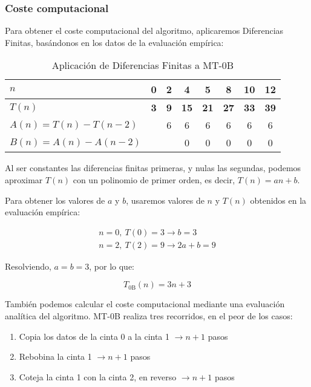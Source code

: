 \subsubsection*{Coste computacional}
Para obtener el coste computacional del algoritmo, aplicaremos Diferencias Finitas, basándonos en los datos de la evaluación empírica:

\begin{table}[H]
    \centering
    \begin{tabular}{|l|c|c|c|c|c|c|c|}
        \hline
        $n$ & \textbf{0} & \textbf{2} & \textbf{4} & \textbf{5} & \textbf{8} & \textbf{10} & \textbf{12} \\ \hline
        $T(n)$ & \textbf{3} & \textbf{9} & \textbf{15} & \textbf{21} & \textbf{27} & \textbf{33} & \textbf{39} \\ \hline
        \hline
        $A(n) = T(n) - T(n-2)$ &    &  6 &  6 &  6 &  6 &  6 &  6 \\ \hline
        $B(n) = A(n) - A(n-2)$ &    &    & 0 &  0 &  0 &  0 &  0 \\ \hline
    \end{tabular}
    \label{tab:0B}
    \caption{Aplicación de Diferencias Finitas a MT-0B}
\end{table}

Al ser constantes las diferencias finitas primeras, y nulas las segundas, podemos aproximar $T(n)$ con un polinomio de primer orden, es decir, $T(n) = an + b$.\medskip

Para obtener los valores de $a$ y $b$, usaremos valores de $n$ y $T(n)$ obtenidos en la evaluación empírica:

\begin{subequations}
    \begin{gather*}
        n = 0,\ T(0) = 3 \rightarrow b = 3 \\
        n = 2,\ T(2) = 9 \rightarrow 2a + b = 9
    \end{gather*}
\end{subequations}

Resolviendo, $a=b=3$, por lo que:

\begin{equation}
    T_{\mathrm{0B}}(n) = 3n + 3
    \label{eq:Tn0B}
\end{equation}

También podemos calcular el coste computacional mediante una evaluación analítica del algoritmo. MT-0B realiza tres recorridos, en el peor de los casos:
\begin{enumerate}
    \item Copia los datos de la cinta 0 a la cinta 1 $\rightarrow n+1$ pasos
    \item Rebobina la cinta 1 $\rightarrow n+1$ pasos
    \item Coteja la cinta 1 con la cinta 2, en reverso $\rightarrow n+1$ pasos
\end{enumerate}

